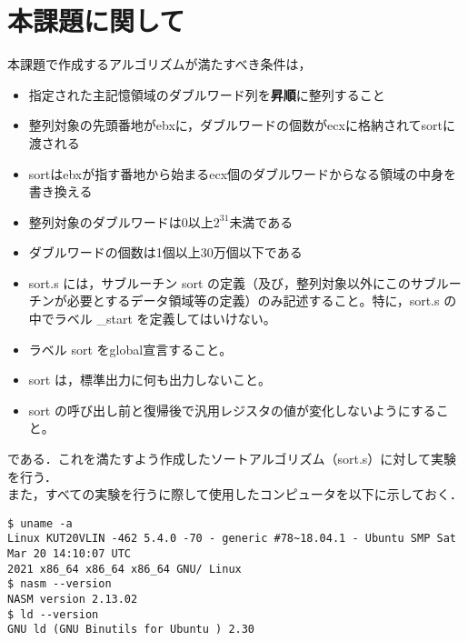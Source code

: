 \chapter{本課題に関して}
本課題で作成するアルゴリズムが満たすべき条件は，
\begin{itemize}
\item 指定された主記憶領域のダブルワード列を\textbf{昇順}に整列すること
\item 整列対象の先頭番地がebxに，ダブルワードの個数がecxに格納されてsortに渡される
\item sortはebxが指す番地から始まるecx個のダブルワードからなる領域の中身を書き換える
\item 整列対象のダブルワードは$0$以上$2^{31}$未満である
\item ダブルワードの個数は1個以上30万個以下である
\item sort.s には，サブルーチン sort の定義（及び，整列対象以外にこのサブルーチンが必要とするデータ領域等の定義）のみ記述すること。特に，sort.s の中でラベル \_start を定義してはいけない。
\item ラベル sort をglobal宣言すること。
  \item sort は，標準出力に何も出力しないこと。
  \item sort の呼び出し前と復帰後で汎用レジスタの値が変化しないようにすること。
\end{itemize}
である．これを満たすよう作成したソートアルゴリズム（sort.s）に対して実験を行う．\\
また，すべての実験を行うに際して使用したコンピュータを以下に示しておく．
\begin{lstlisting}[numbers={none}, caption={使用したコンピュータとソフトウェア}]
$ uname -a
Linux KUT20VLIN -462 5.4.0 -70 - generic #78~18.04.1 - Ubuntu SMP Sat Mar 20 14:10:07 UTC
2021 x86_64 x86_64 x86_64 GNU/ Linux
$ nasm --version
NASM version 2.13.02
$ ld --version
GNU ld (GNU Binutils for Ubuntu ) 2.30
\end{lstlisting}
